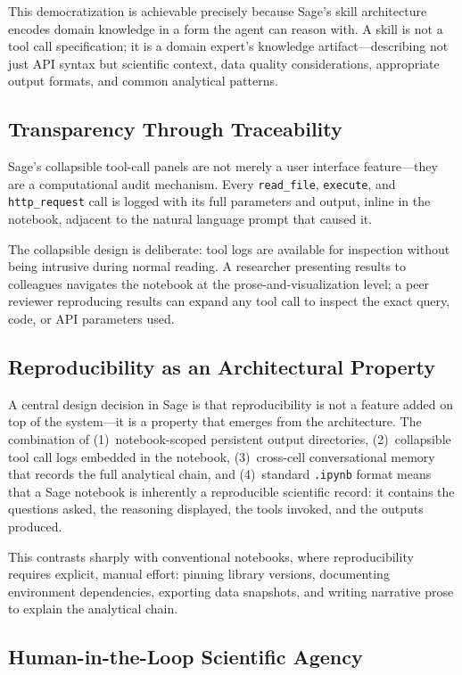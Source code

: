 \documentclass[10pt,twocolumn]{article}
\begin{document}
This democratization is achievable precisely because Sage's skill architecture encodes domain knowledge in a form the agent can reason with. A skill is not a tool call specification; it is a domain expert's knowledge artifact---describing not just API syntax but scientific context, data quality considerations, appropriate output formats, and common analytical patterns.

\subsection{Transparency Through Traceability}

Sage's collapsible tool-call panels are not merely a user interface feature---they are a computational audit mechanism. Every \texttt{read\_file}, \texttt{execute}, and \texttt{http\_request} call is logged with its full parameters and output, inline in the notebook, adjacent to the natural language prompt that caused it.

The collapsible design is deliberate: tool logs are available for inspection without being intrusive during normal reading. A researcher presenting results to colleagues navigates the notebook at the prose-and-visualization level; a peer reviewer reproducing results can expand any tool call to inspect the exact query, code, or API parameters used.

\subsection{Reproducibility as an Architectural Property}

A central design decision in Sage is that reproducibility is not a feature added on top of the system---it is a property that emerges from the architecture. The combination of (1)~notebook-scoped persistent output directories, (2)~collapsible tool call logs embedded in the notebook, (3)~cross-cell conversational memory that records the full analytical chain, and (4)~standard \texttt{.ipynb} format means that a Sage notebook is inherently a reproducible scientific record: it contains the questions asked, the reasoning displayed, the tools invoked, and the outputs produced.

This contrasts sharply with conventional notebooks, where reproducibility requires explicit, manual effort: pinning library versions, documenting environment dependencies, exporting data snapshots, and writing narrative prose to explain the analytical chain.

\subsection{Human-in-the-Loop Scientific Agency}
\end{document}
